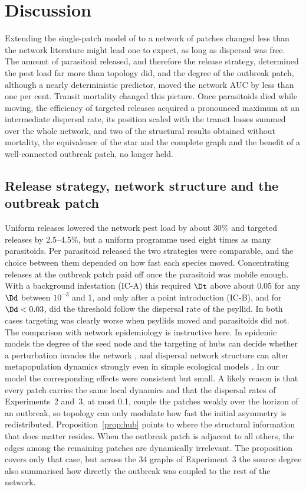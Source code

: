\section{Discussion}
\label{sec:discussion}

Extending the single-patch model of \citep{RodriguezFalcon2026} to a network of patches changed less than the network literature might lead one to expect, as long as dispersal was free. The amount of parasitoid released, and therefore the release strategy, determined the pest load far more than topology did, and the degree of the outbreak patch, although a nearly deterministic predictor, moved the network AUC by less than one per cent. Transit mortality changed this picture. Once parasitoids died while moving, the efficiency of targeted releases acquired a pronounced maximum at an intermediate dispersal rate, its position scaled with the transit losses summed over the whole network, and two of the structural results obtained without mortality, the equivalence of the star and the complete graph and the benefit of a well-connected outbreak patch, no longer held.

\subsection*{Release strategy, network structure and the outbreak patch}

Uniform releases lowered the network pest load by about 30\% and targeted releases by 2.5--4.5\%, but a uniform programme used eight times as many parasitoids. Per parasitoid released the two strategies were comparable, and the choice between them depended on how fast each species moved. Concentrating releases at the outbreak patch paid off once the parasitoid was mobile enough. With a background infestation (IC-A) this required $\Dt$ above about 0.05 for any $\Dd$ between $10^{-3}$ and 1, and only after a point introduction (IC-B), and for $\Dd < 0.03$, did the threshold follow the dispersal rate of the psyllid. In both cases targeting was clearly worse when psyllids moved and parasitoids did not. The comparison with network epidemiology is instructive here. In epidemic models the degree of the seed node and the targeting of hubs can decide whether a perturbation invades the network \citep{PastorSatorras2001,Colizza2007}, and dispersal network structure can alter metapopulation dynamics strongly even in simple ecological models \citep{holland2008,gilarranz2012}. In our model the corresponding effects were consistent but small. A likely reason is that every patch carries the same local dynamics and that the dispersal rates of Experiments~2 and~3, at most 0.1, couple the patches weakly over the horizon of an outbreak, so topology can only modulate how fast the initial asymmetry is redistributed. Proposition~\ref{prop:hub} points to where the structural information that does matter resides. When the outbreak patch is adjacent to all others, the edges among the remaining patches are dynamically irrelevant. The proposition covers only that case, but across the 34 graphs of Experiment~3 the source degree also summarised how directly the outbreak was coupled to the rest of the network.

